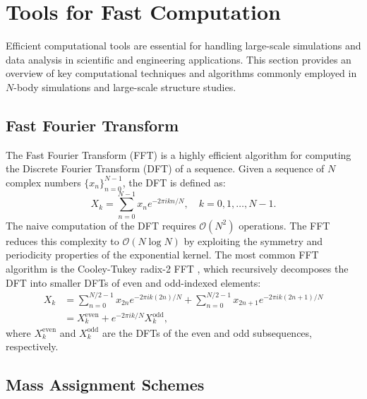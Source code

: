 \section{Tools for Fast Computation}

Efficient computational tools are essential for handling large-scale simulations and data analysis in scientific and engineering applications. 
This section provides an overview of key computational techniques and algorithms commonly employed in $N$-body simulations and large-scale structure studies.

\subsection{Fast Fourier Transform}
The Fast Fourier Transform (FFT) is a highly efficient algorithm for computing the Discrete Fourier Transform (DFT) of a sequence. Given a sequence of $N$ complex numbers $\{x_n\}_{n=0}^{N-1}$, the DFT is defined as:
\begin{equation}
    X_k = \sum_{n=0}^{N-1} x_n e^{-2\pi i kn / N}, \quad k = 0, 1, \dots, N-1.
\end{equation}
The naive computation of the DFT requires $\mathcal{O}(N^2)$ operations. The FFT reduces this complexity to $\mathcal{O}(N \log N)$ by exploiting the symmetry and periodicity properties of the exponential kernel. The most common FFT algorithm is the Cooley-Tukey radix-2 FFT \citep{d3ea2d52-5ab2-3128-8b80-efb85267295d}, which recursively decomposes the DFT into smaller DFTs of even and odd-indexed elements:
\begin{align}
    X_k &= \sum_{n=0}^{N/2-1} x_{2n} e^{-2\pi i k (2n) / N} + \sum_{n=0}^{N/2-1} x_{2n+1} e^{-2\pi i k (2n+1) / N} \\
         &= X_k^{\text{even}} + e^{-2\pi i k / N} X_k^{\text{odd}},
\end{align}
where $X_k^{\text{even}}$ and $X_k^{\text{odd}}$ are the DFTs of the even and odd subsequences, respectively.

\subsection{Mass Assignment Schemes}\label{sec:mass-assignment}


